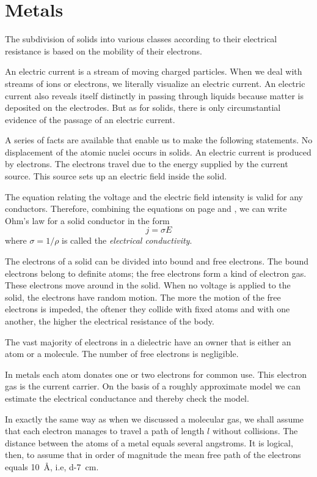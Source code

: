 \section{Metals}

The subdivision of solids into various classes according to their electrical resistance is based on the mobility of their electrons.

An electric current is a stream of moving charged particles. When we deal with streams of ions or electrons, we literally visualize an electric current. An electric current also reveals itself distinctly in passing through liquids because matter is deposited on the electrodes. But as for solids, there is only circumstantial evidence of the passage of an electric current.

A series of facts are available that enable us to make the following statements. No displacement of the atomic nuclei occurs in solids. An electric current is produced by electrons. The electrons travel due to the energy supplied by the current source. This source sets up an electric field inside the solid.

The equation relating the voltage and the electric field intensity is valid for any conductors. Therefore, combining the equations on page \pageref{curr-density} and \pageref{energy-field}, we can write Ohm's law for a solid conductor in the form
\begin{equation*}%
j= \sigma E
\end{equation*}
where $\sigma =1/\rho$ is called the \emph{electrical conductivity}. 

The electrons of a solid can be divided into bound and free electrons. The bound electrons belong to definite atoms; the free electrons form a kind of electron gas. These electrons move around in the solid. When no voltage is applied to the solid, the electrons have random motion. The more the motion of the free electrons is impeded, the oftener they collide with fixed atoms and with one another, the higher the electrical resistance of the body. 

The vast majority of electrons in a dielectric have an owner that is either an atom or a molecule. The number of free electrons is negligible.

In metals each atom donates one or two electrons for common use. This electron gas is the current carrier. On the basis of a roughly approximate model we can estimate the electrical conductance and thereby check the model.

In exactly the same way as when we discussed a molecular gas, we shall assume that each electron manages to travel a path of length $l$ without collisions. The distance between the atoms of a metal equals several angstroms. It is logical, then, to assume that in order of magnitude the mean free path of the electrons equals \SI{10}{\angstrom}, i.e, \SI{d-7}{\centi\meter}.

